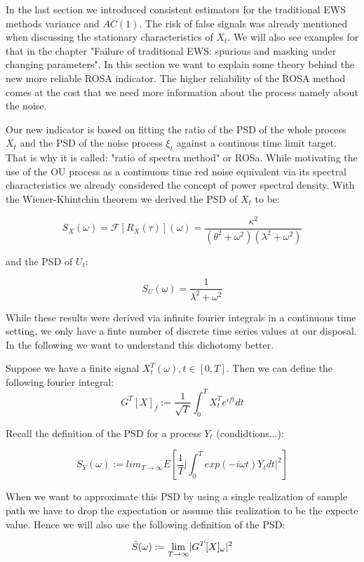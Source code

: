 \documentclass[%
thesis=student,%
coverpage=false,%
titlepage=false,%
headmarks=true, %
german,%
font=libertine, %
math=newpxtx, %
BCOR=5mm,%
coverBCOR=11mm%
]{tumbook}
\begin{document}
In the last section we introduced consistent estimators for the traditional EWS methods variance and $AC(1)$. The risk of false signals was already mentioned when discussing the stationary characteristics of $X_{t}$. We will also see examples for that in the chapter "Failure of traditional EWS: spurious and masking under changing parameters". In this section we want to explain some theory behind the new more reliable ROSA indicator. The higher reliability of the ROSA method comes at the cost that we need more information about the process namely about the noise. 

Our new indicator is based on fitting the ratio of the PSD of the whole process $X_{t}$ and the PSD of the noise process $\xi_{t}$ against a continous time limit target. That is why it is called: "ratio of spectra method" or ROSa. While motivating the use of the OU process as a continuous time red noise equivalent via its spectral characteristics we already considered the concept of power spectral density. With the Wiener-Khintchin theorem we derived the PSD of $X_{t}$ to be:

\[
S_{X}(\omega) = \mathcal{F}[R_{X}(\tau)](\omega) = \frac{\kappa^{2}}{(\theta^{2} + \omega^{2})(\lambda^{2} + \omega^{2})}
\]

and the PSD of $U_{t}$:

\[
S_{U}(\omega) = \frac{1}{\lambda^2 + \omega^2}
\]

While these results were derived via infinite fourier integrals in a continuous time setting, we only have a finte number of discrete time series values at our disposal. In the following we want to understand this dichotomy better.

Suppose we have a finite signal $X_{t}^{T}(\omega), t \in [0,T]$. Then we can define the following fourier integral: 
\[
    G^{T}[X]_{ f} := \frac{1}{\sqrt{T}}\int_{0}^{T}X_{t}^{T}e^{i f t}dt
\]

Recall the definition of the PSD for a process $Y_{t}$ (condidtions...):

\[
S_{Y}(\omega) := lim_{T\rightarrow\infty}E[\frac{1}{T}\lvert\int_{0}^{T}exp(-i\omega t)Y_{t}dt \rvert^{2}]
\]

When we want to approximate this PSD by using a single realization of sample path we have to drop the expectation or assume this realization to be the expecte value. Hence we will also use the following definition of the PSD:

\[
    \Tilde{S}(\omega) := \lim_{T\rightarrow\infty} \lvert G^{T}[X]_{\omega}\rvert ^2
\]
\end{document}
